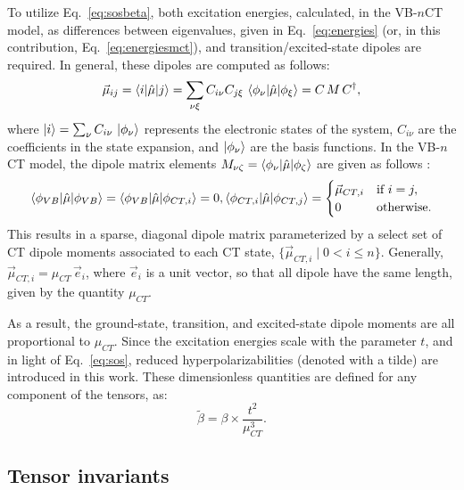 \documentclass[USenglish]{article}
\begin{document}
To utilize Eq.~\eqref{eq:sosbeta}, both excitation energies, calculated, in the VB-$n$CT model, as differences between eigenvalues, given in Eq.~\eqref{eq:energies} (or, in this contribution, Eq.~\eqref{eq:energiesmct}), and transition/excited-state dipoles are required. In general, these dipoles are computed as follows:
\begin{equation}
\vec{\mu}_{ij} = \braket{i | \hat{\mu} | j} = \sum_{\nu\xi} C_{i \nu} C_{j \xi} \, \braket{\phi_\nu | \hat{\mu} | \phi_\xi} = C\,M\,C^\dagger,
\end{equation}
where $\ket{i} = \sum_\nu C_{i \nu} \, \ket{\phi_\nu}$ represents the electronic states of the system, $C_{i \nu}$ are the coefficients in the state expansion, and $\ket{\phi_\nu}$ are the basis functions. 
In the VB-$n$CT model, the dipole matrix elements $M_{\nu\zeta} = \braket{\phi_\nu | \hat{\mu} | \phi_\zeta}$ are given as follows \cite{luValenceBondChargeTransferModel1994}:
\begin{align}
\braket{\phi_{VB} | \hat{\mu} | \phi_{VB}} = \braket{\phi_{VB} | \hat{\mu} | \phi_{CT,i}} = 0,
\braket{\phi_{CT,i} | \hat{\mu} | \phi_{CT,j}} = 
\begin{cases}
	\vec{\mu}_{CT,i} & \text{if } i = j, \\
	0 & \text{otherwise}.
\end{cases}
\end{align}
This results in a sparse, diagonal dipole matrix parameterized by a select set of CT dipole moments associated to each CT state, $\{\vec{\mu}_{CT,i} \mid 0 < i \leq n\}$. Generally, $\vec\mu_{CT, i} = \mu_{CT}\,\vec{e}_i$, where $\vec  e_i$ is a unit vector, so that all dipole have the same length, given by the quantity $\mu_{CT}$.  

As a result, the ground-state, transition, and excited-state dipole moments are all proportional to $ \mu_{CT}$. Since the excitation energies scale with the parameter $t$, and in light of Eq.~\eqref{eq:sos}, reduced hyperpolarizabilities (denoted with a tilde) are introduced in this work. These dimensionless quantities are defined for any component of the tensors, as:
\begin{equation}
	\tilde\beta = \beta \times \frac{t^2}{\mu_{CT}^3}. \label{eq:reduced}
\end{equation}

 
\subsection{Tensor invariants}
\end{document}
